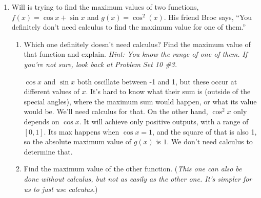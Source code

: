\documentclass{article}
\begin{document}
\begin{enumerate}

    

\pspace{\newpage}

\item
  \begin{problem}
    Will is trying to find the maximum values of two functions,
    $f(x) = \cos x + \sin x$ and $g(x) = \cos^2(x)$.  His friend Broc says, ``You definitely don't need calculus to find the maximum value for one of them.''
  \end{problem}

  \begin{enumerate}
      \item 
      \begin{problem}
          Which one definitely doesn't need calculus? Find the maximum value of that function and explain. \emph{Hint: You know the range of one of them. If you're not sure, look back at Problem Set 10 \#3.}
      \end{problem}
      \pspace{\vfill}

  \begin{solution}
   $\cos x$ and $\sin x$ both oscillate between -1 and 1, but these occur at different values of $x$. It's hard to know what their sum is (outside of the special angles), where the maximum sum would happen, or what its value would be. We'll need calculus for that. On the other hand, $\cos^2 x$ only depends on $\cos x$. It will achieve only positive outputs, with a range of $[0, 1]$. Its max happens when $\cos x =1$, and the square of that is also 1, so the absolute maximum value of $g(x)$ is $1$. We don't need calculus to determine that.
  \end{solution}

    \item 
      \begin{problem}
          Find the maximum value of the other function. (\emph{This one can also be done without calculus, but not as easily as the other one. It's simpler for us to just use calculus.})
      \end{problem}


\end{enumerate}
\end{enumerate}
\end{document}
